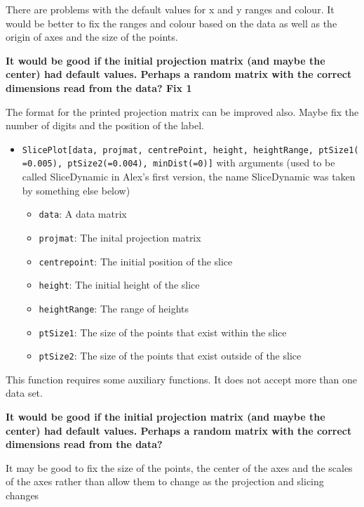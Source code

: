 \documentclass[]{interact}
\theoremstyle{plain}%
\theoremstyle{definition}
\theoremstyle{remark}
\providecommand{\tightlist}{%
  \setlength{\itemsep}{0pt}\setlength{\parskip}{0pt}}
\def\tightlist{}
\begin{document}
There are problems with the default values for x and y ranges and
colour. It would be better to fix the ranges and colour based on the
data as well as the origin of axes and the size of the points.

\textbf{It would be good if the initial projection matrix (and maybe the
center) had default values. Perhaps a random matrix with the correct
dimensions read from the data? Fix 1}

The format for the printed projection matrix can be improved also. Maybe
fix the number of digits and the position of the label.

\begin{itemize}
\item
  \texttt{SlicePlot{[}data,\ projmat,\ centrePoint,\ height,\ heightRange,\ ptSize1(=0.005),\ ptSize2(=0.004),\ minDist(=0){]}}
  with arguments (used to be called SliceDynamic in Alex's first
  version, the name SliceDynamic was taken by something else below)

  \begin{itemize}
  \tightlist
  \item
    \texttt{data}: A data matrix
  \item
    \texttt{projmat}: The inital projection matrix
  \item
    \texttt{centrepoint}: The initial position of the slice
  \item
    \texttt{height}: The initial height of the slice
  \item
    \texttt{heightRange}: The range of heights
  \item
    \texttt{ptSize1}: The size of the points that exist within the slice
  \item
    \texttt{ptSize2}: The size of the points that exist outside of the
    slice
  \end{itemize}
\end{itemize}

This function requires some auxiliary functions. It does not accept more
than one data set.

\textbf{It would be good if the initial projection matrix (and maybe the
center) had default values. Perhaps a random matrix with the correct
dimensions read from the data?}

It may be good to fix the size of the points, the center of the axes and
the scales of the axes rather than allow them to change as the
projection and slicing changes
\end{document}

